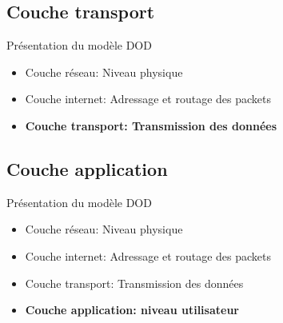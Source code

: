 \begin{frame}\frametitle{}
    \subsection{Couche transport} %
    {\Huge Présentation du modèle DOD}

    \begin{itemize}
        \item {\Large Couche réseau}: Niveau physique
        \item {\Large Couche internet}: Adressage et routage des packets
        \item \textbf{{\Large Couche transport}: Transmission des données}
    \end{itemize}


\end{frame}


\begin{frame}\frametitle{}
    \subsection{Couche application}
    {\Huge Présentation du modèle DOD}

    \begin{itemize}
        \item {\Large Couche réseau}: Niveau physique
        \item {\Large Couche internet}: Adressage et routage des packets
        \item {\Large Couche transport}: Transmission des données
        \item \textbf{{\Large Couche application}: niveau utilisateur}
    \end{itemize}

\end{frame}

